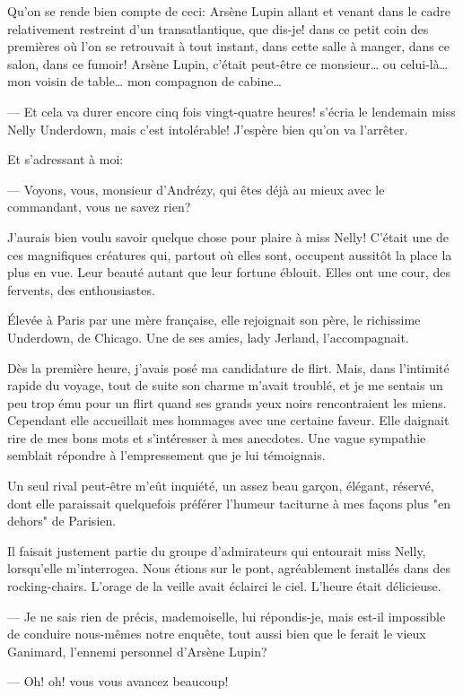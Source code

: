 \documentclass[12pt,a4paper]{book}
\begin{document}
Qu’on se rende bien compte de ceci: Arsène Lupin allant et venant dans le cadre relativement restreint d’un transatlantique, que dis-je! dans ce petit coin des premières où l’on se retrouvait à tout instant, dans cette salle à manger, dans ce salon, dans ce fumoir! Arsène Lupin, c’était peut-être ce monsieur… ou celui-là… mon voisin de table… mon compagnon de cabine…

— Et cela va durer encore cinq fois vingt-quatre heures! s’écria le lendemain miss Nelly Underdown, mais c’est intolérable! J’espère bien qu’on va l’arrêter. 

Et s’adressant à moi:

— Voyons, vous, monsieur d’Andrézy, qui êtes déjà au mieux avec le commandant, vous ne savez rien?

J’aurais bien voulu savoir quelque chose pour plaire à miss Nelly! C’était une de ces magnifiques créatures qui, partout où elles sont, occupent aussitôt la place la plus en vue. Leur beauté autant que leur fortune éblouit. Elles ont une cour, des fervents, des enthousiastes.

Élevée à Paris par une mère française, elle rejoignait son père, le richissime Underdown, de Chicago. Une de ses amies, lady Jerland, l’accompagnait.

Dès la première heure, j’avais posé ma candidature de flirt. Mais, dans l’intimité rapide du voyage, tout de suite son charme m’avait troublé, et je me sentais un peu trop ému pour un flirt quand ses grands yeux noirs rencontraient les miens. Cependant elle accueillait mes hommages avec une certaine faveur. Elle daignait rire de mes bons mots et s’intéresser à mes anecdotes. Une vague sympathie semblait répondre à l’empressement que je lui témoignais.

Un seul rival peut-être m’eût inquiété, un assez beau garçon, élégant, réservé, dont elle paraissait quelquefois préférer l’humeur taciturne à mes façons plus "en dehors" de Parisien.

Il faisait justement partie du groupe d’admirateurs qui entourait miss Nelly, lorsqu’elle m’interrogea. Nous étions sur le pont, agréablement installés dans des rocking-chairs. L’orage de la veille avait éclairci le ciel. L’heure était délicieuse.

— Je ne sais rien de précis, mademoiselle, lui répondis-je, mais est-il impossible de conduire nous-mêmes notre enquête, tout aussi bien que le ferait le vieux Ganimard, l’ennemi personnel d’Arsène Lupin?

— Oh! oh! vous vous avancez beaucoup!
\end{document}
